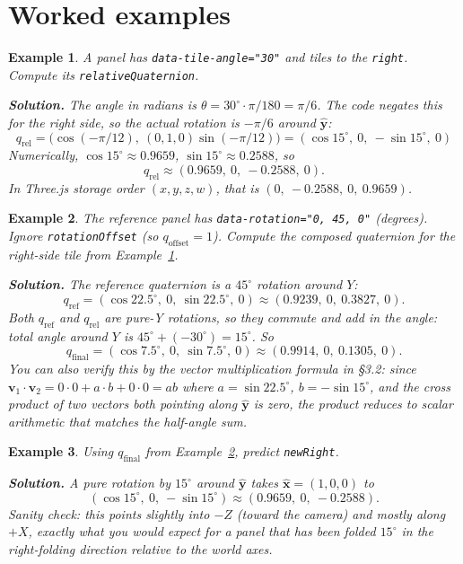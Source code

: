 \documentclass{article}
\newtheorem{example}{Example}
\begin{document}
\section{Worked examples}

\begin{example}\label{ex:axis-angle}
A panel has \texttt{data-tile-angle="30"} and tiles to the
\texttt{right}. Compute its \texttt{relativeQuaternion}.

\medskip
\textbf{Solution.} The angle in radians is
$\theta = 30^\circ \cdot \pi/180 = \pi/6$. The code negates this for the
right side, so the actual rotation is $-\pi/6$ around $\hat{\mathbf{y}}$:
\[
  q_{\text{rel}} = \bigl(\cos(-\pi/12),\ (0,1,0)\sin(-\pi/12)\bigr)
                 = (\cos 15^\circ,\ 0,\ -\sin 15^\circ,\ 0)
\]
Numerically, $\cos 15^\circ \approx 0.9659$, $\sin 15^\circ \approx 0.2588$, so
\[
  q_{\text{rel}} \approx (0.9659,\ 0,\ -0.2588,\ 0).
\]
In Three.js storage order $(x, y, z, w)$, that is
$(0,\ -0.2588,\ 0,\ 0.9659)$.
\end{example}

\begin{example}\label{ex:compose}
The reference panel has \texttt{data-rotation="0, 45, 0"} (degrees).
Ignore \texttt{rotationOffset} (so $q_{\text{offset}} = 1$). Compute the
composed quaternion for the right-side tile from
Example~\ref{ex:axis-angle}.

\medskip
\textbf{Solution.} The reference quaternion is a $45^\circ$ rotation
around $Y$:
\[
  q_{\text{ref}} = (\cos 22.5^\circ,\ 0,\ \sin 22.5^\circ,\ 0)
                 \approx (0.9239,\ 0,\ 0.3827,\ 0).
\]
Both $q_{\text{ref}}$ and $q_{\text{rel}}$ are pure-Y rotations, so they
commute and add in the angle: total angle around $Y$ is
$45^\circ + (-30^\circ) = 15^\circ$. So
\[
  q_{\text{final}} = (\cos 7.5^\circ,\ 0,\ \sin 7.5^\circ,\ 0)
                   \approx (0.9914,\ 0,\ 0.1305,\ 0).
\]
You can also verify this by the vector multiplication formula in \S 3.2:
since $\mathbf{v}_1 \cdot \mathbf{v}_2 = 0 \cdot 0 + a\cdot b + 0\cdot 0 = ab$
where $a = \sin 22.5^\circ$, $b = -\sin 15^\circ$, and the cross
product of two vectors both pointing along $\hat{\mathbf{y}}$ is zero, the
product reduces to scalar arithmetic that matches the half-angle sum.
\end{example}

\begin{example}\label{ex:basis}
Using $q_{\text{final}}$ from Example~\ref{ex:compose}, predict
\texttt{newRight}.

\medskip
\textbf{Solution.} A pure rotation by $15^\circ$ around $\hat{\mathbf{y}}$
takes $\hat{\mathbf{x}} = (1,0,0)$ to
\[
  (\cos 15^\circ,\ 0,\ -\sin 15^\circ) \approx (0.9659,\ 0,\ -0.2588).
\]
Sanity check: this points slightly into $-Z$ (toward the camera) and
mostly along $+X$, exactly what you would expect for a panel that has
been folded $15^\circ$ in the right-folding direction relative to the
world axes.
\end{example}
\end{document}
